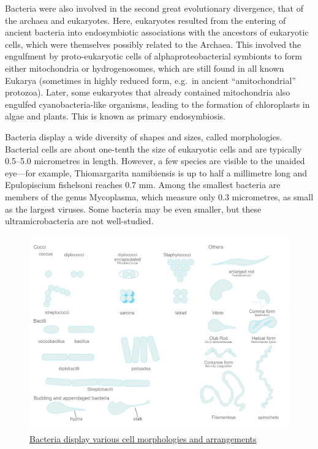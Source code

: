 Bacteria were also involved in the second great evolutionary divergence, that of the archaea and eukaryotes. Here, eukaryotes resulted from the entering of ancient bacteria into endosymbiotic associations with the ancestors of eukaryotic cells, which were themselves possibly related to the Archaea. This involved the engulfment by proto-eukaryotic cells of alphaproteobacterial symbionts to form either mitochondria or hydrogenosomes, which are still found in all known Eukarya (sometimes in highly reduced form, e.g.~in ancient ``amitochondrial'' protozoa). Later, some eukaryotes that already contained mitochondria also engulfed cyanobacteria-like organisms, leading to the formation of chloroplasts in algae and plants. This is known as primary endosymbiosis.

Bacteria display a wide diversity of shapes and sizes, called morphologies. Bacterial cells are about one-tenth the size of eukaryotic cells and are typically 0.5--5.0 micrometres in length. However, a few species are visible to the unaided eye---for example, Thiomargarita namibiensis is up to half a millimetre long and Epulopiscium fishelsoni reaches 0.7 mm. Among the smallest bacteria are members of the genus Mycoplasma, which measure only 0.3 micrometres, as small as the largest viruses. Some bacteria may be even smaller, but these ultramicrobacteria are not well-studied.



\begin{figure}

{\centering \includegraphics[width=0.7\linewidth]{./figures/bacteria/bacterial_shapes} 

}

\caption{\href{https://commons.wikimedia.org/wiki/File:Bacterial_morphology_diagram.svg}{Bacteria display various cell morphologies and arrangements}}\label{fig:bacteriashape}
\end{figure}

